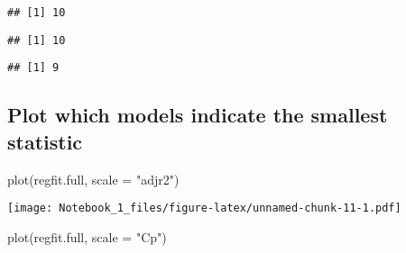 \documentclass[
]{article}
\newenvironment{Shaded}{\begin{snugshade}}{\end{snugshade}}
\newcommand{\AttributeTok}[1]{\textcolor[rgb]{0.77,0.63,0.00}{#1}}
\newcommand{\CommentTok}[1]{\textcolor[rgb]{0.56,0.35,0.01}{\textit{#1}}}
\newcommand{\FunctionTok}[1]{\textcolor[rgb]{0.00,0.00,0.00}{#1}}
\newcommand{\NormalTok}[1]{#1}
\newcommand{\SpecialCharTok}[1]{\textcolor[rgb]{0.00,0.00,0.00}{#1}}
\newcommand{\StringTok}[1]{\textcolor[rgb]{0.31,0.60,0.02}{#1}}
\begin{document}
\begin{verbatim}
## [1] 10
\end{verbatim}

\begin{Shaded}
\end{Shaded}

\begin{verbatim}
## [1] 10
\end{verbatim}

\begin{Shaded}
\end{Shaded}

\begin{verbatim}
## [1] 9
\end{verbatim}

\hypertarget{plot-which-models-indicate-the-smallest-statistic}{%
\subsection{Plot which models indicate the smallest
statistic}\label{plot-which-models-indicate-the-smallest-statistic}}

\begin{Shaded}
\begin{Highlighting}[]
\FunctionTok{plot}\NormalTok{(regfit.full, }\AttributeTok{scale =} \StringTok{"adjr2"}\NormalTok{)}
\end{Highlighting}
\end{Shaded}

\texttt{[image: Notebook\_1\_files/figure-latex/unnamed-chunk-11-1.pdf]}

\begin{Shaded}
\begin{Highlighting}[]
\FunctionTok{plot}\NormalTok{(regfit.full, }\AttributeTok{scale =} \StringTok{"Cp"}\NormalTok{)}
\end{Highlighting}
\end{Shaded}
\end{document}
